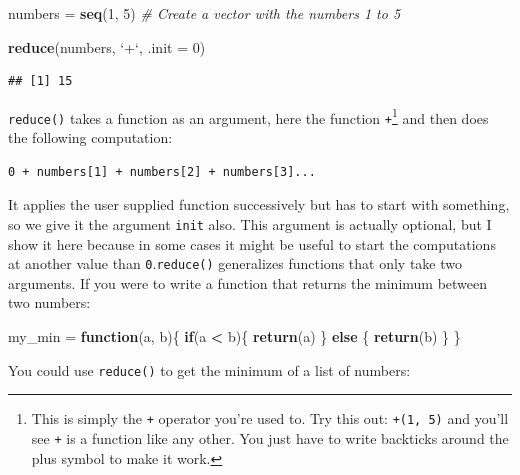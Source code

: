 \documentclass[]{gitbook}
\newenvironment{Shaded}{\begin{snugshade}}{\end{snugshade}}
\newcommand{\CommentTok}[1]{\textcolor[rgb]{0.56,0.35,0.01}{\textit{#1}}}
\newcommand{\ControlFlowTok}[1]{\textcolor[rgb]{0.13,0.29,0.53}{\textbf{#1}}}
\newcommand{\DataTypeTok}[1]{\textcolor[rgb]{0.13,0.29,0.53}{#1}}
\newcommand{\DecValTok}[1]{\textcolor[rgb]{0.00,0.00,0.81}{#1}}
\newcommand{\KeywordTok}[1]{\textcolor[rgb]{0.13,0.29,0.53}{\textbf{#1}}}
\newcommand{\NormalTok}[1]{#1}
\newcommand{\OperatorTok}[1]{\textcolor[rgb]{0.81,0.36,0.00}{\textbf{#1}}}
\newcommand{\StringTok}[1]{\textcolor[rgb]{0.31,0.60,0.02}{#1}}
\let\rmarkdownfootnote\footnote%
\def\footnote{\protect\rmarkdownfootnote}
\theoremstyle{definition}
\theoremstyle{definition}
\theoremstyle{definition}
\theoremstyle{remark}
\begin{document}
\begin{Shaded}
\begin{Highlighting}[]
\NormalTok{numbers =}\StringTok{ }\KeywordTok{seq}\NormalTok{(}\DecValTok{1}\NormalTok{, }\DecValTok{5}\NormalTok{) }\CommentTok{# Create a vector with the numbers 1 to 5}

\KeywordTok{reduce}\NormalTok{(numbers, }\StringTok{`}\DataTypeTok{+}\StringTok{`}\NormalTok{, }\DataTypeTok{.init =} \DecValTok{0}\NormalTok{)}
\end{Highlighting}
\end{Shaded}

\begin{verbatim}
## [1] 15
\end{verbatim}

\texttt{reduce()} takes a function as an argument, here the function
\texttt{+}\footnote{This is simply the \texttt{+} operator you're used
  to. Try this out: \texttt{\textasciigrave{}+\textasciigrave{}(1,\ 5)}
  and you'll see \texttt{+} is a function like any other. You just have
  to write backticks around the plus symbol to make it work.} and then
does the following computation:

\begin{verbatim}
0 + numbers[1] + numbers[2] + numbers[3]...
\end{verbatim}

It applies the user supplied function successively but has to start with
something, so we give it the argument \texttt{init} also. This argument
is actually optional, but I show it here because in some cases it might
be useful to start the computations at another value than
\texttt{0}.\texttt{reduce()} generalizes functions that only take two
arguments. If you were to write a function that returns the minimum
between two numbers:

\begin{Shaded}
\begin{Highlighting}[]
\NormalTok{my_min =}\StringTok{ }\ControlFlowTok{function}\NormalTok{(a, b)\{}
    \ControlFlowTok{if}\NormalTok{(a }\OperatorTok{<}\StringTok{ }\NormalTok{b)\{}
        \KeywordTok{return}\NormalTok{(a)}
\NormalTok{    \} }\ControlFlowTok{else}\NormalTok{ \{}
        \KeywordTok{return}\NormalTok{(b)}
\NormalTok{    \}}
\NormalTok{\}}
\end{Highlighting}
\end{Shaded}

You could use \texttt{reduce()} to get the minimum of a list of numbers:
\end{document}
